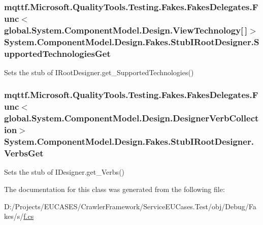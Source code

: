 \hypertarget{class_system_1_1_component_model_1_1_design_1_1_fakes_1_1_stub_i_root_designer_a19cc9b841a7eb184e7c761880d6df801}{
\subsubsection[{Supported\-Technologies\-Get}]{\setlength{\rightskip}{0pt plus 5cm}mqttf.\-Microsoft.\-Quality\-Tools.\-Testing.\-Fakes.\-Fakes\-Delegates.\-Func$<$global.\-System.\-Component\-Model.\-Design.\-View\-Technology\mbox{[}$\,$\mbox{]}$>$ System.\-Component\-Model.\-Design.\-Fakes.\-Stub\-I\-Root\-Designer.\-Supported\-Technologies\-Get}}\label{class_system_1_1_component_model_1_1_design_1_1_fakes_1_1_stub_i_root_designer_a19cc9b841a7eb184e7c761880d6df801}


Sets the stub of I\-Root\-Designer.\-get\-\_\-\-Supported\-Technologies()

\hypertarget{class_system_1_1_component_model_1_1_design_1_1_fakes_1_1_stub_i_root_designer_ad1676704e20a8d8dc33fb1d6f48ff31a}{
\subsubsection[{Verbs\-Get}]{\setlength{\rightskip}{0pt plus 5cm}mqttf.\-Microsoft.\-Quality\-Tools.\-Testing.\-Fakes.\-Fakes\-Delegates.\-Func$<$global.\-System.\-Component\-Model.\-Design.\-Designer\-Verb\-Collection$>$ System.\-Component\-Model.\-Design.\-Fakes.\-Stub\-I\-Root\-Designer.\-Verbs\-Get}}\label{class_system_1_1_component_model_1_1_design_1_1_fakes_1_1_stub_i_root_designer_ad1676704e20a8d8dc33fb1d6f48ff31a}


Sets the stub of I\-Designer.\-get\-\_\-\-Verbs()



The documentation for this class was generated from the following file\-:\begin{DoxyCompactItemize}
\item 
D\-:/\-Projects/\-E\-U\-C\-A\-S\-E\-S/\-Crawler\-Framework/\-Service\-E\-U\-Cases.\-Test/obj/\-Debug/\-Fakes/s/\hyperlink{s_2f_8cs}{f.\-cs}\end{DoxyCompactItemize}
